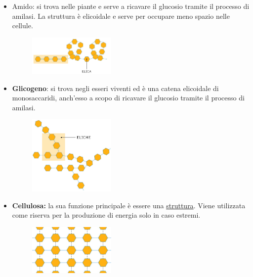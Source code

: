 \documentclass{article}
\begin{document}
\begin{itemize}
    \item Amido: si trova nelle piante e serve a ricavare il glucosio tramite il processo di
        amilasi. La struttura è elicoidale e serve per occupare meno spazio nelle cellule.
        \begin{figure}[ht!]
            \centering
            \includegraphics[width=0.4\textwidth]{media/amido.png}
        \end{figure}
    \newpage
    \item \textbf{Glicogeno}: si trova negli esseri viventi ed è una catena elicoidale di
        monosaccaridi, anch'esso a scopo di ricavare il glucosio tramite il processo di amilasi.
        \begin{figure}[ht!]
            \centering
            \includegraphics[width=0.4\textwidth]{media/glicogeno.png}
        \end{figure}

    \item \textbf{Cellulosa:} la sua funzione principale è essere una \underline{struttura}.
        Viene utilizzata come riserva per la produzione di energia solo in caso estremi.
        \begin{figure}[ht!]
            \centering
            \includegraphics*[width=0.4\textwidth]{media/cellulosa.png}
        \end{figure}
\end{itemize}
\end{document}
